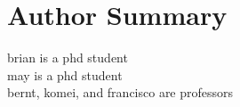 \section{Author Summary}
brian is a phd student\\
may is a phd student\\
bernt, komei, and francisco are professors